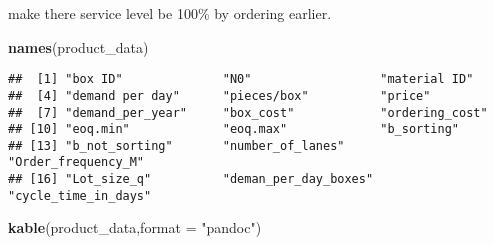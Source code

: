 \documentclass[
]{article}
\newenvironment{Shaded}{\begin{snugshade}}{\end{snugshade}}
\newcommand{\DataTypeTok}[1]{\textcolor[rgb]{0.13,0.29,0.53}{#1}}
\newcommand{\KeywordTok}[1]{\textcolor[rgb]{0.13,0.29,0.53}{\textbf{#1}}}
\newcommand{\NormalTok}[1]{#1}
\newcommand{\StringTok}[1]{\textcolor[rgb]{0.31,0.60,0.02}{#1}}
\begin{document}
make there service level be 100\% by ordering earlier.

\begin{Shaded}
\begin{Highlighting}[]
\KeywordTok{names}\NormalTok{(product_data)}
\end{Highlighting}
\end{Shaded}

\begin{verbatim}
##  [1] "box ID"              "N0"                  "material ID"        
##  [4] "demand per day"      "pieces/box"          "price"              
##  [7] "demand_per_year"     "box_cost"            "ordering_cost"      
## [10] "eoq.min"             "eoq.max"             "b_sorting"          
## [13] "b_not_sorting"       "number_of_lanes"     "Order_frequency_M"  
## [16] "Lot_size_q"          "deman_per_day_boxes" "cycle_time_in_days"
\end{verbatim}

\begin{Shaded}
\begin{Highlighting}[]
\KeywordTok{kable}\NormalTok{(product_data,}\DataTypeTok{format =} \StringTok{"pandoc"}\NormalTok{)}
\end{Highlighting}
\end{Shaded}
\end{document}
